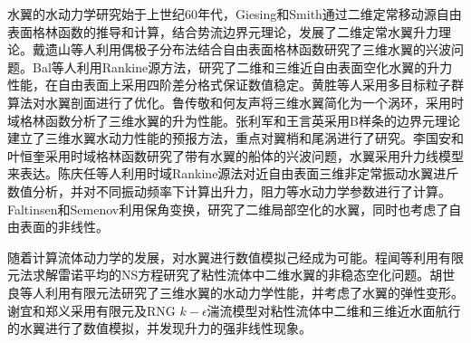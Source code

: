 \documentclass[10.5pt,twocolumn]{jbuaa}
\begin{document}
水翼的水动力学研究始于上世纪60年代，Giesing和Smith\cite{giesing}通过二维定常移动源自由表面格林函数的推导和计算，结合势流边界元理论，发展了二维定常水翼升力理论。戴遗山等人\cite{dai}利用偶极子分布法结合自由表面格林函数研究了三维水翼的兴波问题。Bal等人\cite{bal}\cite{bal2}利用Rankine源方法，研究了二维和三维近自由表面空化水翼的升力性能，在自由表面上采用四阶差分格式保证数值稳定。黄胜等人\cite{huang}采用多目标粒子群算法对水翼剖面进行了优化。鲁传敬和何友声\cite{lu}将三维水翼简化为一个涡环，采用时域格林函数分析了三维水翼的升为性能。张利军和王言英\cite{zhang}采用B样条的边界元理论建立了三维水翼水动力性能的预报方法，重点对翼梢和尾涡进行了研究。李国安和叶恒奎\cite{li}采用时域格林函数研究了带有水翼的船体的兴波问题，水翼采用升力线模型来表达。陈庆任等人\cite{chen}利用时域Rankine源法对近自由表面三维非定常振动水翼进斤数值分析，并对不同振动频率下计算出升力，阻力等水动力学参数进行了计算。Faltinsen和Semenov\cite{fal}利用保角变换，研究了二维局部空化的水翼，同时也考虑了自由表面的非线性。

随着计算流体动力学的发展，对水翼进行数值模拟己经成为可能。程闻等\cite{cheng}利用有限元法求解雷诺平均的NS方程研究了粘性流体中二维水翼的非稳态空化问题。胡世良等人\cite{hu}利用有限元法研究了三维水翼的水动力学性能，并考虑了水翼的弹性变形。谢宜和郑义\cite{xie}采用有限元及RNG $k-\epsilon$湍流模型对粘性流体中二维和三维近水面航行的水翼进行了数值模拟，并发现升力的强非线性现象。
\end{document}
